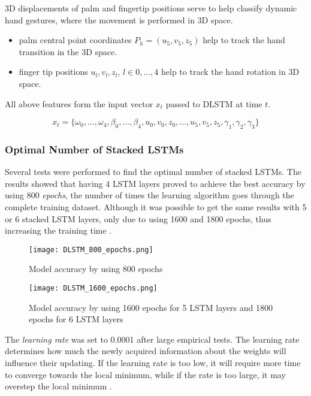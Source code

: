 3D displacements of palm and fingertip positions serve to help classify dynamic hand gestures, where the movement is performed in 3D space.


\begin{itemize}
	\item palm central point coordinates $P_h = (u_5, v_5, z_5)$ help to track the hand transition in the 3D space.
	\item finger tip positions $u_l, v_l, z_l$, $l \in {0, ..., 4}$ help to track the hand rotation in 3D space.
\end{itemize}

All above features form the input vector $x_t$ passed to DLSTM at time $t$.

\begin{equation}
	{x_t = \{\omega_0, ...,\omega_4, \beta_0, ..., \beta_4, u_0,v_0,z_0, ..., u_5,v_5,z_5, \gamma_1, \gamma_2, \gamma_3\}}
\end{equation}

\subsubsection{Optimal Number of Stacked LSTMs}

Several tests were performed to find the optimal number of stacked LSTMs. The results showed that having 4 LSTM layers proved to achieve the best accuracy by using 800 \textit{epochs}, the number of times the learning algorithm goes through the complete training dataset. Although it was possible to get the same results with 5 or 6 stacked LSTM layers, only due to using 1600 and 1800 epochs, thus increasing the training time \cite{avola}. 

\begin{figure}[ht]
	\centering
    \texttt{[image: DLSTM\_800\_epochs.png]}
	\caption{Model accuracy by using 800 epochs \cite{avola}}
	\label{fig:DLSTM_800_epochs}
\end{figure}

\begin{figure}[ht]
	\centering
    \texttt{[image: DLSTM\_1600\_epochs.png]}
	\caption{Model accuracy by using 1600 epochs for 5 LSTM layers and 1800 epochs for 6 LSTM layers \cite{avola}}
	\label{fig:DLSTM_1600_epochs}
\end{figure}

The \textit{learning rate} was set to 0.0001 after large empirical tests. The learning rate determines how much the newly acquired information about the weights will influence their updating. If the learning rate is too low, it will require more time to converge towards the local minimum, while if the rate is too large, it may overstep the local minimum \cite{avola}.

